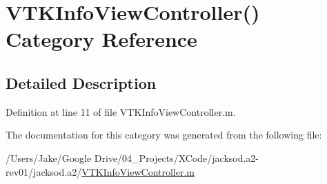 \hypertarget{category_v_t_k_info_view_controller_07_08}{\section{V\+T\+K\+Info\+View\+Controller() Category Reference}
\label{category_v_t_k_info_view_controller_07_08}
}


\subsection{Detailed Description}


Definition at line 11 of file V\+T\+K\+Info\+View\+Controller.\+m.



The documentation for this category was generated from the following file\+:\begin{DoxyCompactItemize}
\item 
/\+Users/\+Jake/\+Google Drive/04\+\_\+\+Projects/\+X\+Code/jacksod.\+a2-\/rev01/jacksod.\+a2/\hyperlink{_v_t_k_info_view_controller_8m}{V\+T\+K\+Info\+View\+Controller.\+m}\end{DoxyCompactItemize}
